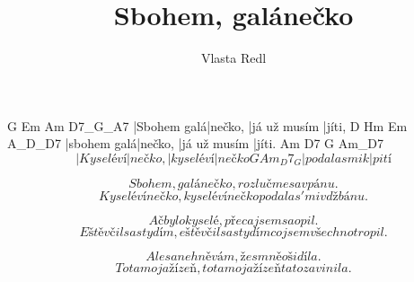 \documentclass{song}
\title{Sbohem, galánečko}
\author{Vlasta Redl}
\begin{document}
\strophe
G           Em      Am           D7_G_A7
|Sbohem galá|nečko, |já už musím |jíti,
D           Hm      Em           A_D_D7
|sbohem galá|nečko, |já už musím |jíti.
   Am        D7      G         Am_D7
\[ |Kyselé ví|nečko, |kyselé ví|nečko
G             Am_D7_G
|podalas mi k |pití \]
\endstrophe

\strophe*
\[ Sbohem, galánečko, rozlučme sa v pánu. \]
\[ Kyselé vínečko, kyselé vínečko
podalas' mi v džbánu. \]
\endstrophe

\strophe*
\[ Ač bylo kyselé, přeca jsem sa opil. \]
\[ Eště včil sa stydím, eště včil sa stydím
co jsem všechno tropil. \]
\endstrophe

\strophe*
\[ Ale sa nehněvám, žes mně ošidíla. \]
\[ To ta moja žízeň, to ta moja žízeň
ta to zavinila.\]
\endstrophe
\end{document}
